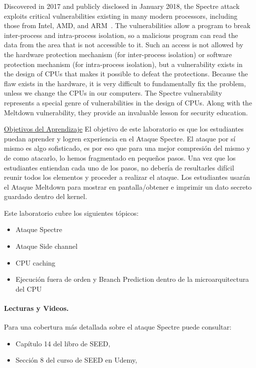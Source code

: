Discovered in 2017 and publicly disclosed in January 2018, the Spectre
attack exploits critical vulnerabilities existing in many modern
processors, including those from Intel, AMD, and
ARM~\cite{Kocher2018spectre}. The vulnerabilities
allow a program to break inter-process and intra-process isolation, so a
malicious program can read the data from the area that is not accessible to
it.  Such an access is not allowed by the hardware protection mechanism
(for inter-process isolation) or software protection mechanism (for
intra-process isolation), but a vulnerability exists in the design of CPUs
that makes it possible to defeat the protections.  Because the flaw exists
in the hardware, it is very difficult to fundamentally fix the problem,
unless we change the CPUs in our computers. The Spectre vulnerability
represents a special genre of vulnerabilities in the design of CPUs. Along
with the Meltdown vulnerability, they provide an invaluable lesson for
security education. 

\underline{Objetivos del Aprendizaje} El objetivo de este laboratorio es que los estudiantes puedan aprender y logren experiencia en el Ataque Spectre. El ataque por sí mismo es algo sofisticado, es por eso que para una mejor compresión del mismo y de como atacarlo, lo hemos fragmentado en pequeños pasos. Una vez que los estudiantes entiendan cada uno de los pasos, no debería de resultarles difícil reunir todos los elementos y proceder a realizar el ataque. Los estudiantes usarán el Ataque Meltdown para mostrar en pantalla/obtener e imprimir un dato secreto guardado dentro del kernel.

Este laboratorio cubre los siguientes tópicos:


\begin{itemize}[noitemsep]
\item Ataque Spectre
\item Ataque Side channel
\item CPU caching
\item Ejecución fuera de orden y Branch Prediction dentro de la microarquitectura del CPU
\end{itemize}



\paragraph{Lecturas y Videos.}
Para una cobertura más detallada sobre el ataque Spectre puede consultar:

\begin{itemize}
\item Capítulo 14 del libro de SEED, \seedbook
\item Sección 8 del curso de SEED en Udemy, \seedcsvideo
\end{itemize}


